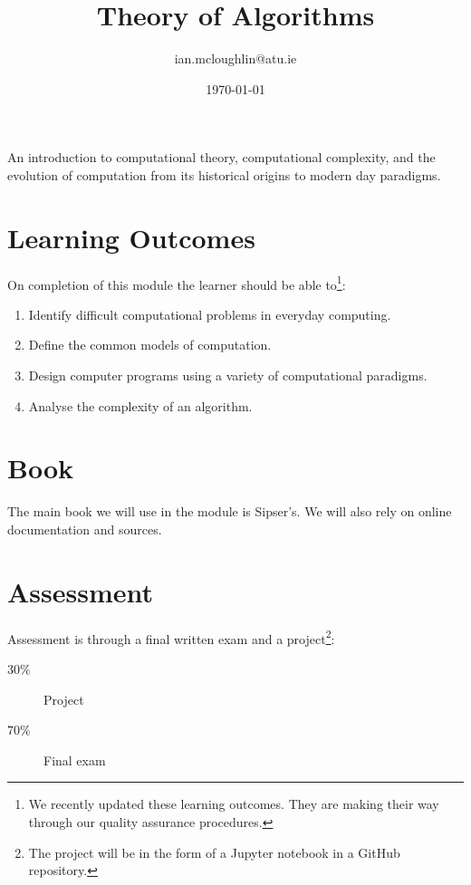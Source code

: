 \documentclass{iansnotes}
\title{Theory of Algorithms}
\author{ian.mcloughlin@atu.ie}
\date{\today}
\begin{document}
\maketitle
An introduction to computational theory, computational complexity, and the evolution of computation from its historical origins to modern day paradigms.


\section{Learning Outcomes}
On completion of this module the learner should be able to\footnote{We recently updated these learning outcomes. They are making their way through our quality assurance procedures.}:

\begin{enumerate}
  \item Identify difficult computational problems in everyday computing.
  \item Define the common models of computation.
  \item Design computer programs using a variety of computational paradigms.
  \item Analyse the complexity of an algorithm.
\end{enumerate}


\section{Book}
The main book we will use in the module is Sipser's\autocite{sipser}.
We will also rely on online documentation and sources.


\section{Assessment}
Assessment is through a final written exam and a project\footnote{The project will be in the form of a Jupyter notebook in a GitHub repository.}:

\begin{description}
  \item[$30\%$] Project
  \item[$70\%$] Final exam
\end{description}

 
\end{document}
